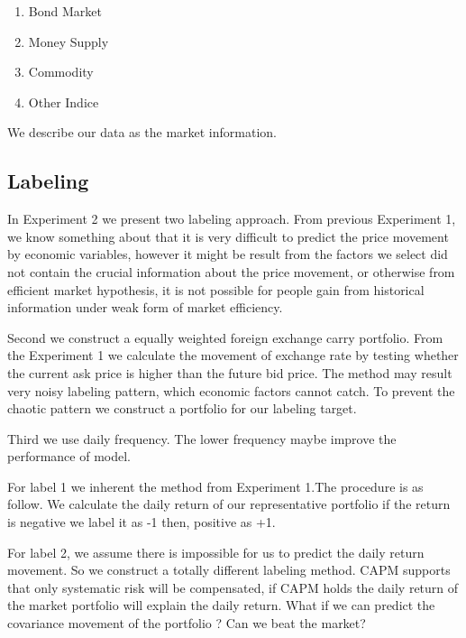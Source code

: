 {\begin{enumerate}
\item{Bond Market}
\subitem{}
\subitem{}
\item{Money Supply}
\item{Commodity}

\item{Other Indice}

\end{enumerate}
\newpage
    We describe our data as the market information. 


\subsection{Labeling}

    In Experiment 2 we present two labeling approach. From previous Experiment 1, we know something about that it is very difficult to predict the price movement by economic variables, however it might be result from the factors we select did not contain the crucial information about the price movement, or otherwise from efficient market hypothesis, it is not possible for people gain from historical information under weak form of market efficiency.
    
    Second we construct a equally weighted foreign exchange carry portfolio. From the Experiment 1 we calculate the movement of exchange rate by testing whether the current ask price is higher than the future bid price. The method may result  very noisy labeling pattern, which economic factors cannot catch. To prevent the chaotic pattern we construct a portfolio for our labeling target.
    
    Third we use daily frequency. The lower frequency maybe improve the performance of model.
    
    For label 1 we inherent the method from Experiment 1.The procedure is as follow.
We calculate the daily return of our representative portfolio
if the return is negative we label it as -1 then, positive as +1.

    For label 2, we assume there is impossible for us to predict the daily return movement. So we construct a totally different labeling method. CAPM supports that only systematic risk will be compensated, if CAPM holds the daily return of the market portfolio will explain the daily return. What if we can predict the covariance movement of the portfolio ? Can we beat the market?
    
}
